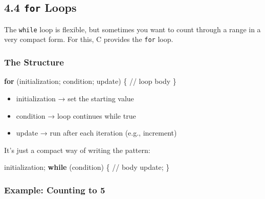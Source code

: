 \documentclass[
  letterpaper,
  DIV=11,
  numbers=noendperiod]{scrreprt}
\newenvironment{Shaded}{\begin{snugshade}}{\end{snugshade}}
\newcommand{\CommentTok}[1]{\textcolor[rgb]{0.37,0.37,0.37}{#1}}
\newcommand{\ControlFlowTok}[1]{\textcolor[rgb]{0.00,0.23,0.31}{\textbf{#1}}}
\newcommand{\NormalTok}[1]{\textcolor[rgb]{0.00,0.23,0.31}{#1}}
\newcommand{\OperatorTok}[1]{\textcolor[rgb]{0.37,0.37,0.37}{#1}}
\providecommand{\tightlist}{%
  \setlength{\itemsep}{0pt}\setlength{\parskip}{0pt}}
\begin{document}
\subsection{\texorpdfstring{4.4 \texttt{for}
Loops}{4.4 for Loops}}\label{for-loops}

The \texttt{while} loop is flexible, but sometimes you want to count
through a range in a very compact form. For this, C provides the
\texttt{for} loop.

\subsubsection{The Structure}\label{the-structure-2}

\begin{Shaded}
\begin{Highlighting}[]
\ControlFlowTok{for} \OperatorTok{(}\NormalTok{initialization}\OperatorTok{;}\NormalTok{ condition}\OperatorTok{;}\NormalTok{ update}\OperatorTok{)} \OperatorTok{\{}
    \CommentTok{// loop body}
\OperatorTok{\}}
\end{Highlighting}
\end{Shaded}

\begin{itemize}
\tightlist
\item
  initialization → set the starting value
\item
  condition → loop continues while true
\item
  update → run after each iteration (e.g., increment)
\end{itemize}

It's just a compact way of writing the pattern:

\begin{Shaded}
\begin{Highlighting}[]
\NormalTok{initialization}\OperatorTok{;}
\ControlFlowTok{while} \OperatorTok{(}\NormalTok{condition}\OperatorTok{)} \OperatorTok{\{}
    \CommentTok{// body}
\NormalTok{    update}\OperatorTok{;}
\OperatorTok{\}}
\end{Highlighting}
\end{Shaded}

\subsubsection{Example: Counting to 5}\label{example-counting-to-5-1}
\end{document}
